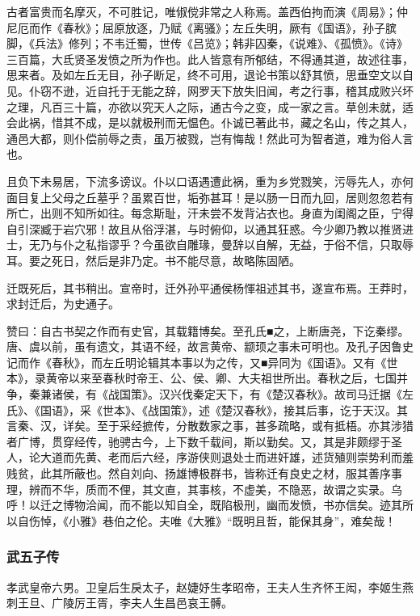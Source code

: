 \documentclass[]{article}
\begin{document}
古者富贵而名摩灭，不可胜记，唯俶傥非常之人称焉。盖西伯拘而演《周易》；仲尼厄而作《春秋》；屈原放逐，乃赋《离骚》；左丘失明，厥有《国语》，孙子膑脚，《兵法》修列；不韦迁蜀，世传《吕览》；韩非囚秦，《说难》、《孤愤》。《诗》三百篇，大氐贤圣发愤之所为作也。此人皆意有所郁结，不得通其道，故述往事，思来者。及如左丘无目，孙子断足，终不可用，退论书策以舒其愤，思垂空文以自见。仆窃不逊，近自托于无能之辞，网罗天下放失旧闻，考之行事，稽其成败兴坏之理，凡百三十篇，亦欲以究天人之际，通古今之变，成一家之言。草创未就，适会此祸，惜其不成，是以就极刑而无愠色。仆诚已著此书，藏之名山，传之其人，通邑大都，则仆偿前辱之责，虽万被戮，岂有悔哉！然此可为智者道，难为俗人言也。

且负下未易居，下流多谤议。仆以口语遇遭此祸，重为乡党戮笑，污辱先人，亦何面目复上父母之丘墓乎？虽累百世，垢弥甚耳！是以肠一日而九回，居则忽忽若有所亡，出则不知所如往。每念斯耻，汗未尝不发背沾衣也。身直为闺阁之臣，宁得自引深臧于岩穴邪！故且从俗浮湛，与时俯仰，以通其狂惑。今少卿乃教以推贤进士，无乃与仆之私指谬乎？今虽欲自雕瑑，曼辞以自解，无益，于俗不信，只取辱耳。要之死日，然后是非乃定。书不能尽意，故略陈固陋。

迁既死后，其书稍出。宣帝时，迁外孙平通侯杨惲祖述其书，遂宣布焉。王莽时，求封迁后，为史通子。

赞曰：自古书契之作而有史官，其载籍博矣。至孔氏■之，上断唐尧，下讫秦缪。唐、虞以前，虽有遗文，其语不经，故言黄帝、颛顼之事未可明也。及孔子因鲁史记而作《春秋》，而左丘明论辑其本事以为之传，又■异同为《国语》。又有《世本》，录黄帝以来至春秋时帝王、公、侯、卿、大夫祖世所出。春秋之后，七国并争，秦兼诸侯，有《战国策》。汉兴伐秦定天下，有《楚汉春秋》。故司马迁据《左氏》、《国语》，采《世本》、《战国策》，述《楚汉春秋》，接其后事，讫于天汉。其言秦、汉，详矣。至于采经摭传，分散数家之事，甚多疏略，或有抵梧。亦其涉猎者广博，贯穿经传，驰骋古今，上下数千载间，斯以勤矣。又，其是非颇缪于圣人，论大道而先黄、老而后六经，序游侠则退处士而进奸雄，述货殖则崇势利而羞贱贫，此其所蔽也。然自刘向、扬雄博极群书，皆称迁有良史之材，服其善序事理，辨而不华，质而不俚，其文直，其事核，不虚美，不隐恶，故谓之实录。乌呼！以迁之博物洽闻，而不能以知自全，既陷极刑，幽而发愤，书亦信矣。迹其所以自伤悼，《小雅》巷伯之伦。夫唯《大雅》``既明且哲，能保其身''，难矣哉！

\hypertarget{header-n4785}{%
\subsubsection{武五子传}\label{header-n4785}}

孝武皇帝六男。卫皇后生戾太子，赵婕妤生孝昭帝，王夫人生齐怀王闳，李姬生燕刺王旦、广陵厉王胥，李夫人生昌邑哀王髆。
\end{document}
